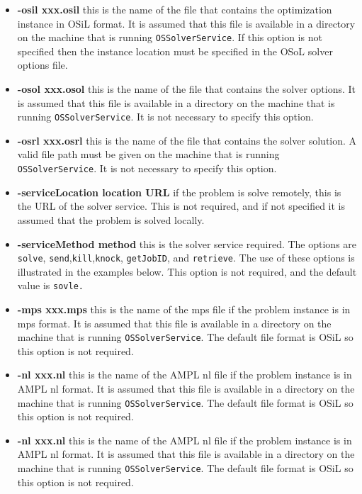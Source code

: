 \documentclass[12pt]{article}
\renewcommand{\_}{{\char"5F}}
\renewcommand{\{}{{\char"7B}}
\renewcommand{\}}{{\char"7D}}
\renewcommand{\^}{{\char"0D}}
\renewcommand{\'}{{\char"0D}}
\begin{document}
\begin{itemize}

\item[] {\bf -osil xxx.osil}  this is the name of the file that contains the optimization instance in OSiL format. It is assumed that this file is available in a directory on the machine that is running {\tt OSSolverService}. If this option is not specified then the instance location must be specified in the OSoL solver options file.

\item[] {\bf -osol xxx.osol}  this is the name of the file that contains the solver options. It is assumed that this file is available in a directory on the machine that is running {\tt OSSolverService}. It is not necessary to specify this option.

\item[] {\bf -osrl xxx.osrl}  this is the name of the file that contains the solver solution. A valid file path must be given on the machine that is running {\tt OSSolverService}. It is not necessary to specify this option.

\item[] {\bf -serviceLocation location URL}  if the problem is solve remotely, this is the URL of the solver service. This is not required, and if not specified it is assumed that the problem is solved locally. 

\item[] {\bf -serviceMethod  method}  this is  the solver service required. The options are {\tt solve}, {\tt send},{\tt kill},{\tt knock}, {\tt getJobID}, and {\tt retrieve}. The use of these options is illustrated in the examples below. This option is not required, and the default value is {\tt sovle.}

\item[] {\bf -mps  xxx.mps}  this is the name of the mps file if the problem instance is in mps format. It is assumed that this file is available in a directory on the machine that is running {\tt OSSolverService}. The default file format is OSiL so this option is not required.

\item[] {\bf -nl  xxx.nl}  this is the name of the AMPL nl file if the problem instance is in AMPL nl  format. It is assumed that this file is available in a directory on the machine that is running {\tt OSSolverService}. The default file format is OSiL so this option is not required.


\item[] {\bf -nl  xxx.nl}  this is the name of the AMPL nl file if the problem instance is in AMPL nl  format. It is assumed that this file is available in a directory on the machine that is running {\tt OSSolverService}. The default file format is OSiL so this option is not required.


\end{itemize}
\end{document}
